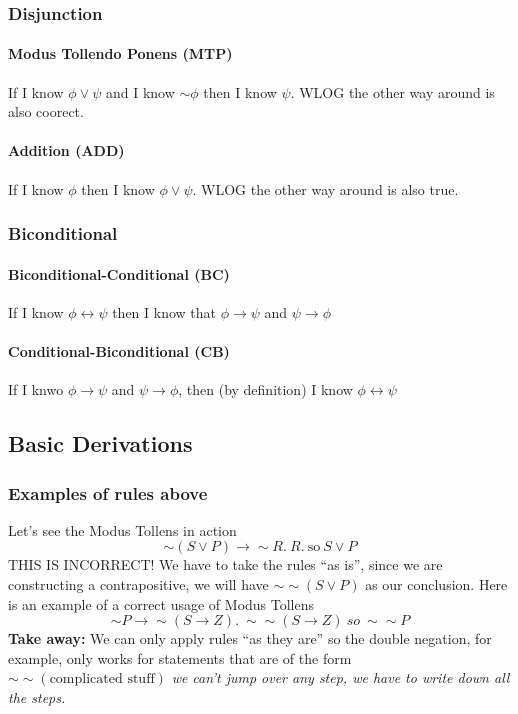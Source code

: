 \documentclass[10pt]{article}
\renewcommand{\iff}{\leftrightarrow}
\begin{document}
\subsubsection{Disjunction}
\paragraph{Modus Tollendo Ponens (MTP)} If I know $\phi \vee \psi$ and 
I know $\sim\phi$ then I know $\psi$. WLOG the other way around is also coorect.
\paragraph{Addition (ADD)} If I know $\phi$ then  I know $\phi \vee \psi$.
 WLOG the other way around is also true.

\subsubsection{Biconditional}
\paragraph{Biconditional-Conditional (BC)} If I know $\phi \iff \psi$ then I 
know that $\phi \rightarrow \psi$ and $\psi \rightarrow \phi$
\paragraph{Conditional-Biconditional (CB)} If I knwo $\phi \rightarrow \psi$ 
and $\psi \rightarrow \phi$, then (by definition) I know  $\phi \iff \psi$

\subsection{Basic Derivations}
\subsubsection{Examples of rules above}
Let's see the Modus Tollens in action
\begin{equation*}
    \sim (S\vee P) \rightarrow \sim R.~ R. ~\text{so}~ S\vee P
\end{equation*}
THIS IS INCORRECT! We have to take the rules ``as is'', since we are constructing a
contrapositive, we will have $\sim\sim (S\vee P)$ as our conclusion. Here is an example of a 
correct usage of Modus Tollens
\begin{equation*}
    \sim P \rightarrow \sim (S\rightarrow Z). ~ \sim\sim (S\rightarrow Z) ~ so ~ \sim\sim P
\end{equation*}
\textbf{Take away:} We can only apply rules ``as they are'' so the double negation, for example,
only works for statements that are of the form $\sim\sim(\text{complicated stuff})$ \textit{we can't 
jump over any step, we have to write down all the steps.}
\end{document}
